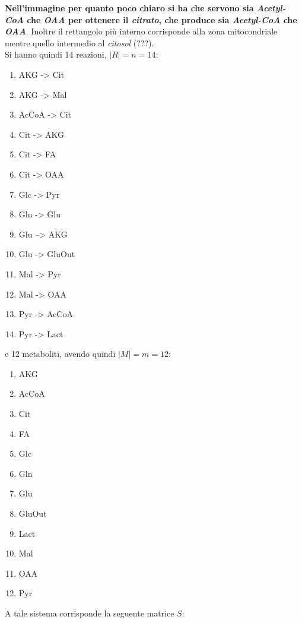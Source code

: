 \documentclass[a4paper,12pt, oneside]{book}
\begin{document}
\textbf{Nell'immagine per quanto poco chiaro si ha che servono sia
  \textit{Acetyl-CoA} che \textit{OAA} per ottenere il
  \textit{citrato}, che produce sia \textit{Acetyl-CoA} che
  \textit{OAA}}. Inoltre il rettangolo più interno corrisponde alla zona 
mitocondriale mentre quello intermedio al \textit{citosol} (???).\\
Si hanno quindi 14 reazioni, $|R|=n=14$:
\begin{multicols}{2}
  \begin{enumerate}
    \item AKG -> Cit
    \item AKG -> Mal
    \item AcCoA -> Cit
    \item Cit -> AKG
    \item Cit -> FA
    \item Cit -> OAA
    \item Glc -> Pyr
    \item Gln -> Glu
    \item Glu –> AKG
    \item Glu -> GluOut
    \item Mal -> Pyr
    \item Mal -> OAA
    \item Pyr -> AcCoA
    \item Pyr -> Lact
  \end{enumerate}
\end{multicols}
e 12 metaboliti, avendo quindi $|M|=m=12$:
\begin{multicols}{4}
  \begin{enumerate}
    \item AKG
    \item AcCoA
    \item Cit
    \item FA
    \item Glc
    \item Gln
    \item Glu
    \item GluOut
    \item Lact
    \item Mal
    \item OAA
    \item Pyr
  \end{enumerate}
\end{multicols}
A tale sistema corrisponde la seguente matrice $S$:
\end{document}
